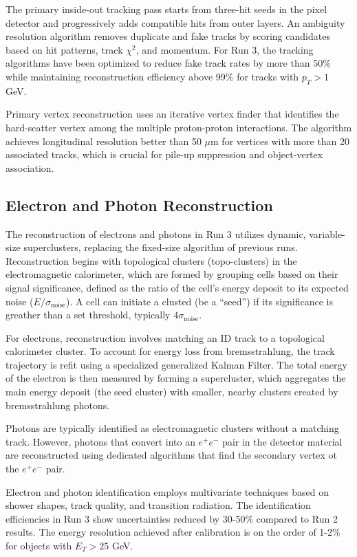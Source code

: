 The primary inside-out tracking pass starts from three-hit seeds in the pixel detector and progressively adds compatible hits from outer layers. An ambiguity resolution algorithm removes duplicate and fake tracks by scoring candidates based on hit patterns, track $\chi^2$, and momentum. For Run 3, the tracking algorithms have been optimized to reduce fake track rates by more than 50\% while maintaining reconstruction efficiency above 99\% for tracks with $p_T > 1$ GeV.

Primary vertex reconstruction uses an iterative vertex finder that identifies the hard-scatter vertex among the multiple proton-proton interactions. The algorithm achieves longitudinal resolution better than 50 $\mu$m for vertices with more than 20 associated tracks, which is crucial for pile-up suppression and object-vertex association.

\subsection{Electron and Photon Reconstruction}

The reconstruction of electrons and photons in Run 3 utilizes dynamic, variable-size superclusters, replacing the fixed-size algorithm of previous runs. Reconstruction begins with topological clusters (topo-clusters) in the electromagnetic calorimeter, which are formed by grouping cells based on their signal significance, defined as the ratio of the cell's energy deposit to its expected noise ($E/\sigma_\text{noise}$). A cell can initiate a clusted (be a ``seed'') if its significance is greather than a set threshold, typically $4\sigma_\text{noise}$.

For electrons, reconstruction involves matching an ID track to a topological calorimeter cluster. To account for energy loss from bremsstrahlung, the track trajectory is refit using a specialized generalized Kalman Filter. The total energy of the electron is then measured by forming a supercluster, which aggregates the main energy deposit (the seed cluster) with smaller, nearby clusters created by bremsstrahlung photons. 

Photons are typically identified as electromagnetic clusters without a matching track. However, photons that convert into an $e^+e^-$ pair in the detector material are reconstructed using dedicated algorithms that find the secondary vertex ot the $e^+e^-$ pair.

Electron and photon identification employs multivariate techniques based on shower shapes, track quality, and transition radiation. The identification efficiencies in Run 3 show uncertainties reduced by 30-50\% compared to Run 2 results. The energy resolution achieved after calibration is on the order of 1-2\% for objects with $E_T > 25$ GeV.


